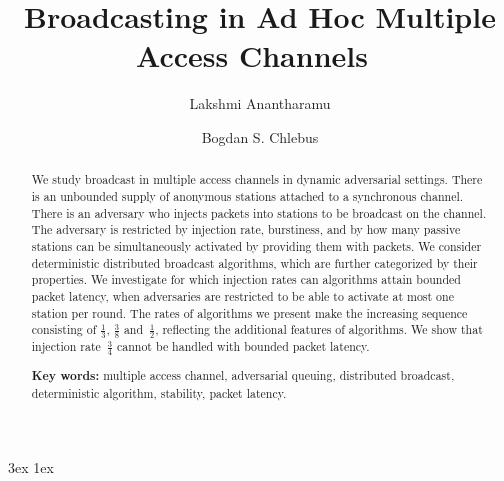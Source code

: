 \documentclass[11pt]{article}
\newcommand{\FFF}{\vspace*{\bigskipamount}}
\begin{document}
\baselineskip 	3ex
\parskip 		1ex

\title{			Broadcasting in Ad Hoc Multiple Access Channels~\footnotemark[1]\FFF\FFF}

\author{		Lakshmi Anantharamu \footnotemark[2]	
			\and 
			Bogdan S. Chlebus \footnotemark[2]}



\date{}

\maketitle



\FFF



\begin{abstract}
We study broadcast in multiple access channels in dynamic  adversarial settings.
There is an unbounded supply of anonymous stations attached to a synchronous channel.
There is an adversary who  injects packets into stations to be broadcast on the channel.
The adversary is restricted by injection rate, burstiness, and by how many passive stations can be simultaneously activated by providing them with packets.
We consider deterministic distributed broadcast algorithms, which are further categorized by their properties.
We investigate for which injection rates can algorithms attain bounded packet latency,  when adversaries are restricted to be able to activate at most one station per round.
The rates of algorithms we present make the increasing sequence consisting of $\frac{1}{3}$, $\frac{3}{8}$ and~$\frac{1}{2}$, reflecting the additional features of algorithms.
We show that injection rate~$\frac{3}{4}$ cannot be handled with bounded packet latency.



\FFF\FFF

\noindent
\textbf{Key words:}
multiple access channel, 
adversarial queuing,
distributed broadcast,
deterministic algorithm,
stability,
packet latency.
\end{abstract}


\vfill
\end{document}
